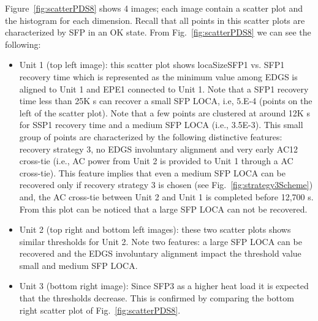 Figure~\ref{fig:scatterPDS8} shows 4 images; each image contain a scatter plot and the histogram for each 
dimension. Recall that all points in this scatter plots are characterized by SFP in an OK state.
From Fig.~\ref{fig:scatterPDS8} we can see the following:
\begin{itemize}
  \item Unit 1 (top left image): this scatter plot shows locaSizeSFP1 vs. SFP1 recovery time which is represented 
        as the minimum value among EDGS is aligned to Unit 1 and EPE1 connected to Unit 1. Note that a SFP1 recovery 
        time less than 25K s can recover a small SFP LOCA, i.e, 5.E-4 (points on the left of the scatter plot). 
        Note that a few points are clustered at around 12K s for SSP1 recovery time and a medium SFP LOCA (i.e., 3.5E-3). 
        This small group of points are characterized by the following distinctive features: recovery strategy 3, no EDGS involuntary 
        alignment and very early AC12 cross-tie (i.e., AC power from Unit 2 is provided to Unit 1 through a AC 
        cross-tie). This feature implies that even a medium SFP LOCA can be recovered only if recovery strategy 3 is
        chosen (see Fig.~\ref{fig:strategy3Scheme}) and, the AC cross-tie between Unit 2 and Unit 1 is completed 
        before 12,700 s. From this plot can be noticed that a large SFP LOCA can not be recovered.
  \item Unit 2 (top right and bottom left images): these two scatter plots shows similar thresholds for Unit 2. 
        Note two features: a large SFP LOCA can be recovered and the EDGS involuntary alignment impact the threshold value 
        small and medium SFP LOCA.
  \item Unit 3 (bottom right image): Since SFP3 as a higher heat load it is expected that the thresholds decrease. This
        is confirmed by comparing the bottom right scatter plot of Fig.~\ref{fig:scatterPDS8}.
\end{itemize}


